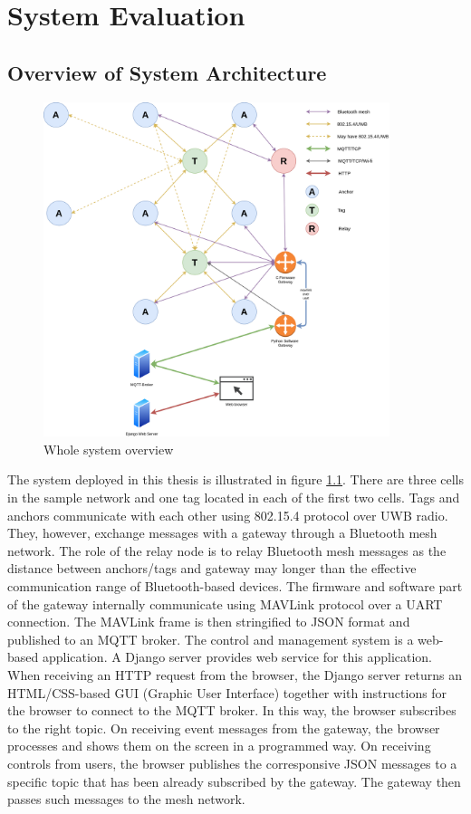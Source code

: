 \documentclass[\main/thesis.tex]{subfiles}
\begin{document}
\graphicspath{{img/}{06_result/img/}}

\chapter{System Evaluation}

\section{Overview of System Architecture}
\begin{figure}[H]
    \centering
    \includegraphics[width=0.9\textwidth]{system_overview.png}
    \caption{Whole system overview}
    \label{fig:system_overview}
\end{figure}
The system deployed in this thesis is illustrated in figure \ref{fig:system_overview}. There are three cells in the sample network and one tag located in each of the first two cells. Tags and anchors communicate with each other using 802.15.4 protocol over UWB radio. They, however, exchange messages with a gateway through a Bluetooth mesh network. The role of the relay node is to relay Bluetooth mesh messages as the distance between anchors/tags and gateway may longer than the effective communication range of Bluetooth-based devices. The firmware and software part of the gateway internally communicate using MAVLink protocol over a UART connection. The MAVLink frame is then stringified to JSON format and published to an MQTT broker. The control and management system is a web-based application. A Django server provides web service for this application. When receiving an HTTP request from the browser, the Django server returns an HTML/CSS-based GUI (Graphic User Interface) together with instructions for the browser to connect to the MQTT broker. In this way, the browser subscribes to the right topic. On receiving event messages from the gateway, the browser processes and shows them on the screen in a programmed way. On receiving controls from users, the browser publishes the corresponsive JSON messages to a specific topic that has been already subscribed by the gateway. The gateway then passes such messages to the mesh network.
\end{document}
